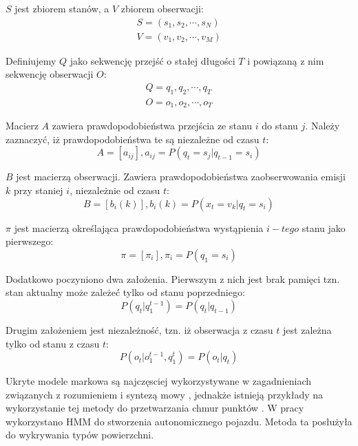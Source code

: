 $S$ jest zbiorem stanów, a $V$ zbiorem obserwacji:
\begin{align}
    S = (s_{1}, s_{2}, \cdots, s_{N}) \\
    V = (v_{1}, v_{2}, \cdots, v_{M}) 
\end{align}

Definiujemy $Q$ jako sekwencję przejść o stałej długości $T$ i powiązaną z nim sekwencję obserwacji $O$:
\begin{align}
    Q = q_{1}, q_{2}, \cdots, q_{T} \\
    O = o_{1}, o_{2}, \cdots, o_{T}
\end{align}

Macierz $A$ zawiera prawdopodobieństwa przejścia ze stanu $i$ do stanu $j$. Należy zaznaczyć, iż prawdopodobieństwa te są niezależne od czasu $t$:
\begin{equation}
    A = [a_{ij}], a_{ij} = P(q_{t} = s_{j} | q_{t-1} = s_{i})
\end{equation}

$B$ jest macierzą obserwacji. Zawiera prawdopodobieństwa zaobserwowania emisji $k$ przy staniej $i$, niezależnie od czasu $t$:
\begin{equation}
    B = [b_{i}(k)], b_{i}(k) = P (x_{t} = v_{k} | q_{t} = s_{i})
\end{equation}

$\pi$ jest macierzą określająca prawdopodobieństwa wystąpienia $i-tego$ stanu jako pierwszego:
\begin{equation}
    \pi = [\pi_{i}], \pi_{i} = P(q_{1} = s_{i})
\end{equation}

Dodatkowo poczyniono dwa założenia. Pierwszym z nich jest brak pamięci tzn. stan aktualny może zależeć tylko od stanu poprzedniego:
\begin{equation}
    P(q_{t}|q_{1}^{t-1}) = P(q_{t}|q_{t-1})
\end{equation}

Drugim założeniem jest niezależność, tzn. iż obserwacja z czasu $t$ jest zależna tylko od stanu z czasu $t$:
\begin{equation}
    P(o_{t}|o_{1}^{t-1},q_{1}^{t}) = P(o_{t}|q_{t})
\end{equation}

Ukryte modele markowa są najczęsciej wykorzystywane w zagadnieniach związanych z rozumieniem i syntezą mowy \cite{blunsom2004}, jednakże istnieją przykłady na wykorzystanie tej metody do przetwarzania
chmur punktów \cite{wang2014}. W pracy \cite{wang2014} wykorzystano HMM do stworzenia autonomicznego pojazdu. Metoda ta posłużyła do wykrywania typów powierzchni.

